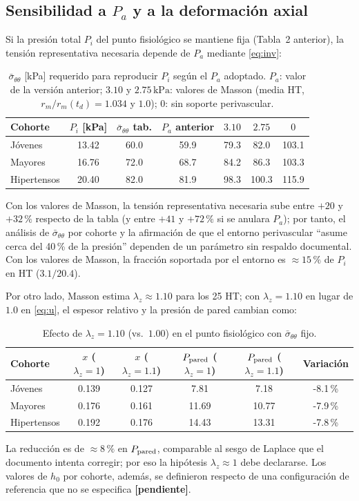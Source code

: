 \documentclass[11pt]{article}
\newcommand{\kPa}{\,\mathrm{kPa}}
\newcommand{\sbar}{\bar\sigma_{\theta\theta}}
\newcommand{\pend}{\textcolor{red!70!black}{\textbf{[pendiente]}}}
\begin{document}
\subsection{Sensibilidad a $P_a$ y a la deformación axial}\label{sec:sens}
Si la presión total $P_i$ del punto fisiológico se mantiene fija (Tabla~2 anterior), la tensión representativa necesaria depende de $P_a$ mediante \eqref{eq:inv}:
\begin{table}[H]\centering\small
\caption{$\sbar$ [kPa] requerido para reproducir $P_i$ según el $P_a$ adoptado. $P_a$: valor de la versión anterior; $3.10$ y $2.75\kPa$: valores de Masson (media HT, $r_m/r_m(t_d)=1.034$ y $1.0$); $0$: sin soporte perivascular.}\label{tab:sens}
\begin{tabular}{lcccccc}\toprule
Cohorte & $P_i$ [kPa] & $\sbar$ tab. & $P_a$ anterior & $3.10$ & $2.75$ & $0$\\\midrule
Jóvenes & 13.42 & 60.0 & 59.9 & 79.3 & 82.0 & 103.1 \\
Mayores & 16.76 & 72.0 & 68.7 & 84.2 & 86.3 & 103.3 \\
Hipertensos & 20.40 & 82.0 & 81.9 & 98.3 & 100.3 & 115.9 \\
\bottomrule\end{tabular}
\end{table}
Con los valores de Masson, la tensión representativa necesaria sube entre $+20$ y $+32\,\%$ respecto de la tabla (y entre $+41$ y $+72\,\%$ si se anulara $P_a$); por tanto, el análisis de $\sbar$ por cohorte y la afirmación de que el entorno perivascular ``asume cerca del 40\,\% de la presión'' dependen de un parámetro sin respaldo documental. Con los valores de Masson, la fracción soportada por el entorno es $\approx15\,\%$ de $P_i$ en HT ($3.1/20.4$).

Por otro lado, Masson estima $\lambda_z\approx1.10$ para los 25 HT; con $\lambda_z=1.10$ en lugar de $1.0$ en \eqref{eq:u}, el espesor relativo y la presión de pared cambian como:
\begin{table}[H]\centering\small
\caption{Efecto de $\lambda_z=1.10$ (vs.\ $1.00$) en el punto fisiológico con $\sbar$ fijo.}\label{tab:lz}
\begin{tabular}{lccccc}\toprule
Cohorte & $x$ ($\lambda_z=1$) & $x$ ($\lambda_z=1.1$) & $P_{\rm pared}$ ($\lambda_z=1$) & $P_{\rm pared}$ ($\lambda_z=1.1$) & Variación\\\midrule
Jóvenes & 0.139 & 0.127 & 7.81 & 7.18 & -8.1\,\% \\
Mayores & 0.176 & 0.161 & 11.69 & 10.77 & -7.9\,\% \\
Hipertensos & 0.192 & 0.176 & 14.43 & 13.31 & -7.8\,\% \\
\bottomrule\end{tabular}
\end{table}
La reducción es de $\approx8\,\%$ en $P_{\rm pared}$, comparable al sesgo de Laplace que el documento intenta corregir; por eso la hipótesis $\lambda_z\approx1$ debe declararse. Los valores de $h_0$ por cohorte, además, se definieron respecto de una configuración de referencia que no se especifica \pend.
\end{document}
